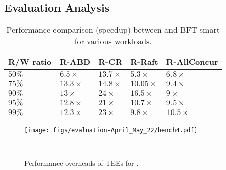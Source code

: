 \subsection{Evaluation Analysis}

\begin{minipage}{\textwidth}
    \begin{minipage}[b]{0.49\textwidth}
        \begin{table}[t]
            \small
            \vspace{-8pt}
            \setlength{\tabcolsep}{3pt}
            \center
            \begin{tabular}{>{\centering\arraybackslash}p{}>{\centering\arraybackslash}p{}>{\centering\arraybackslash}p{}>{\centering\arraybackslash}p{}>{\centering\arraybackslash}p{}}
              \rowcolor{gray!25}
            \textbf{R/W ratio} &  \textbf{R-ABD} & \textbf{R-CR}  & \textbf{R-Raft}  & \textbf{R-AllConcur} \\
            \hline
            $50\%$ & $6.5\times$ & $13.7\times$  & $5.3\times$ & $6.8\times$\\
            \hline
            $75\%$ & $13.3\times$ & $14.8\times$  & $10.05\times$ & $9.4\times$\\
            \hline
            $90\%$ & $13\times$ & $24\times$  & $16.5\times$ & $9\times$\\
            \hline
            $95\%$ & $12.8\times$ & $21\times$  & $10.7\times$ & $9.5\times$\\
            \hline
            $99\%$ & $12.3\times$ & $23\times$  & $9.8\times$ & $10.5\times$\\
            \hline
        \end{tabular}
        
        \caption{Performance comparison (speedup) between \projecttitle{} and BFT-smart for various workloads.}
        \label{tab:speedup}
        \end{table}
    \end{minipage}
  \hfill
  \begin{minipage}[b]{0.49\textwidth}
  \centering
    \begin{figure}
        \texttt{[image: figs/evaluation-April\_May\_22/bench4.pdf]}
        \caption{Performance overheads of TEEs for \projecttitle{}.}
        ~\label{fig:overheads}
    \end{figure}
   \end{minipage}
\end{minipage}
\fi




